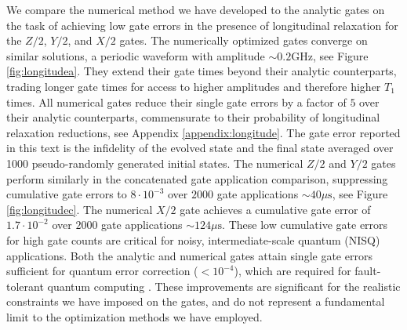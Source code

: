 We compare the numerical method we have developed to the analytic gates
on the task of achieving low gate errors in the presence of longitudinal relaxation
for the $Z/2$, $Y/2$, and $X/2$ gates.
The numerically optimized gates converge on similar solutions, a periodic
waveform with amplitude $\sim 0.2 \textrm{GHz}$, see Figure \ref{fig:longitudea}.
They extend their gate times
beyond their analytic counterparts, trading longer gate times for access
to higher amplitudes and therefore higher $T_{1}$ times. All numerical gates reduce
their single gate errors by a factor of $5$ over
their analytic counterparts, commensurate to their
probability of longitudinal relaxation reductions, see Appendix \ref{appendix:longitude}.
The gate error reported in this text is the infidelity
of the evolved state and the final state averaged over 1000 pseudo-randomly
generated initial states. The numerical $Z/2$ and $Y/2$ gates perform similarly in
the concatenated gate application comparison, suppressing cumulative gate errors to $8 \cdot 10^{-3}$
over $2000$ gate applications $\sim 40 \mu\textrm{s}$, see Figure \ref{fig:longitudec}.
The numerical $X/2$ gate achieves a cumulative gate error of
$1.7 \cdot 10^{-2}$ over $2000$ gate applications $\sim 124 \mu\textrm{s}$.
These low cumulative gate errors for high gate counts are critical for
noisy, intermediate-scale quantum (NISQ) applications.
Both the analytic and numerical gates attain single gate errors sufficient for
quantum error correction ($< 10^{-4}$), which are required for fault-tolerant quantum computing
\cite{aharonov2008fault, fowler2009high, gottesman1997stabilizer}.
These improvements are significant for the realistic constraints we have imposed
on the gates, and do not represent a fundamental limit to the optimization methods we have
employed.
